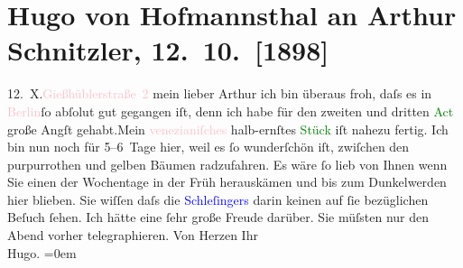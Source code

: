 

               \section[Hugo von Hofmannsthal an Arthur Schnitzler, 12. 10. {[}1898{]}]{ Hugo von Hofmannsthal an Arthur Schnitzler, 12. 10. {[}1898{]}}\nopagebreak{}\rehead{ }\normalsize\beginnumbering{} \toendnotes[C]{\smallbreak\pagebreak[2]} 
\toendnotes[C]{\smallbreak}\pstart
           {\pb}12. X.\hfill \textcolor{pink}{Gießhüblerstraße 2}{}\ledrightnote{\textcolor{pink}{Gießhüblerstraße}}\pend
           \pstart{}mein lieber Arthur\pend\pstart
           ich bin überaus froh, daſs es in \textcolor{pink}{Berlin}{}\ledrightnote{\textcolor{pink}{Berlin}}{ }ſo
                    abſolut gut gegangen iſt, denn ich habe für den zweiten und dritten \textcolor{green}{Act}{} große Angſt gehabt.\hspace*{1.5em}Mein \textcolor{pink}{venezianiſches}{}\ledrightnote{\textcolor{pink}{Venedig}} halb-ernſtes \textcolor{green}{Stück}{} iſt nahezu fertig. Ich bin nun noch für 5–6 Tage
                    hier, weil es ſo wunderſchön iſt, zwiſchen {\pb}den purpurrothen und gelben
                    Bäumen radzufahren. Es wäre ſo lieb von Ihnen wenn Sie einen der Wochentage in
                    der Früh herauskämen und bis zum Dunkelwerden hier blieben. Sie wiſſen daſs die
                        \textcolor{blue}{Schleſingers}{}\ledrightnote{\textcolor{blue}{Emil Schlesinger}{\newline}\textcolor{blue}{Franziska Schlesinger}} darin keinen auf
                    ſie bezüglichen Beſuch {\pb}ſehen. Ich hätte eine ſehr große Freude darüber. Sie müſsten nur den Abend
                    vorher telegraphieren.\pend
           \pstart
           Von Herzen Ihr{\\[\baselineskip]}\spacefill\mbox{Hugo.}\pend
           \leftskip=0em{}\endnumbering{}  
      